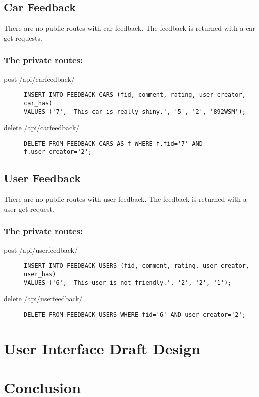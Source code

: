 \documentclass{article}
\begin{document}
\subsection{Car Feedback}
There are no public routes with car feedback. The feedback is returned with a car get requests.

\subsubsection{The private routes:}
\begin{description}
\item[post /api/carfeedback/] \mbox{}
\begin{lstlisting}
INSERT INTO FEEDBACK_CARS (fid, comment, rating, user_creator, car_has)
VALUES ('7', 'This car is really shiny.', '5', '2', '892WSM');
\end{lstlisting}
\item[delete /api/carfeedback/] \mbox{}
\begin{lstlisting}
DELETE FROM FEEDBACK_CARS AS f WHERE f.fid='7' AND f.user_creator='2';
\end{lstlisting}
\end{description}

\subsection{User Feedback}
There are no public routes with user feedback. The feedback is returned with a user get request.

\subsubsection{The private routes:}
\begin{description}
\item[post /api/userfeedback/] \mbox{}
\begin{lstlisting}
INSERT INTO FEEDBACK_USERS (fid, comment, rating, user_creator, user_has)
VALUES ('6', 'This user is not friendly.', '2', '2', '1');
\end{lstlisting}
\item[delete /api/userfeedback/] \mbox{}
\begin{lstlisting}
DELETE FROM FEEDBACK_USERS WHERE fid='6' AND user_creator='2';
\end{lstlisting}
\end{description}

\section{User Interface Draft Design} %

\section{Conclusion}
\end{document}
